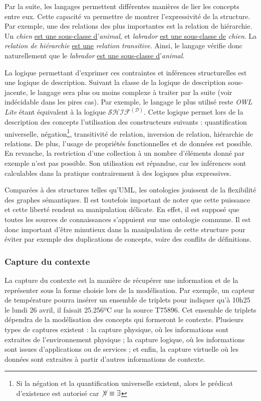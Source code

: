 Par la suite, les langages permettent différentes manières de lier les concepts entre eux. Cette capacité va permettre de montrer l'expressivité de la structure. Par exemple, une des relations des plus importantes est la relation de hiérarchie. Un \textit{chien} \underline{est une sous-classe d}'\textit{animal}, et \textit{labrador} \underline{est une sous-classe de} \textit{chien}. La \textit{relation de hiérarchie} \underline{est une} \textit{relation transitive}. Ainsi, le langage vérifie donc naturellement que le \textit{labrador} \underline{est une sous-classe d}'\textit{animal}. 

La logique permettant d'exprimer ces contraintes et inférences structurelles est une logique de description. Suivant la classe de la logique de description sous-jacente, le langage sera plus ou moins complexe à traiter par la suite (voir indécidable dans les pires cas). Par exemple, le langage le plus utilisé reste \textit{OWL Lite} étant équivalent à la logique $\mathcal{SHIF}^\mathcal{(D)}$. Cette logique permet lors de la description des concepts l'utilisation des constructeurs suivants : quantification universelle, négation\footnote{Si la négation et la quantification universelle existent, alors le prédicat d'existence est autorisé car $\not\forall \equiv \exists$}, transitivité de relation, inversion de relation, hiérarchie de relations. De plus, l'usage de propriétés fonctionnelles et de données est possible. En revanche, la restriction d'une collection à un nombre d'éléments donné par exemple n'est pas possible. Son utilisation est répandue, car les inférences sont calculables dans la pratique contrairement à des logiques plus expressives.

Comparées à des structures telles qu'UML, les ontologies jouissent de la flexibilité des graphes sémantiques. Il est toutefois important de noter que cette puissance et cette liberté rendent sa manipulation délicate. En effet, il est supposé que toutes les sources de connaissances s'appuient sur une ontologie commune. Il est donc important d'être minutieux dans la manipulation de cette structure pour éviter par exemple des duplications de concepts, voire des conflits de définitions.

\subsubsection{Capture du contexte}
La capture du contexte est la manière de récupérer une information et de la représenter sous la forme choisie lors de la modélisation. Par exemple, un capteur de température pourra insérer un ensemble de triplets pour indiquer qu'à 10h25 le lundi 26 avril, il faisait 25.256ºC sur la source T75896. Cet ensemble de triplets dépendra de la modélisation des concepts qui formeront le contexte. Plusieurs types de captures existent : la capture physique, où les informations sont extraites de l'environnement physique ; la capture logique, où les informations sont issues d'applications ou de services ; et enfin, la capture virtuelle où les données sont extraites à partir d'autres informations de contexte.

